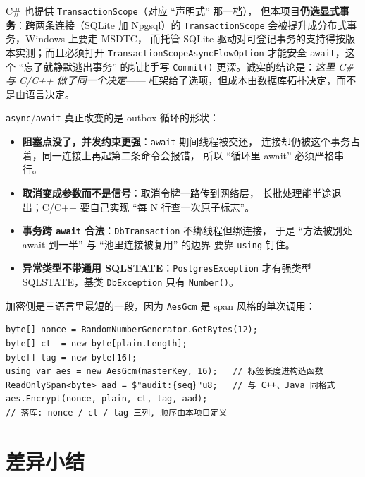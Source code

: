 \documentclass[12pt,a4paper,fontset=fandol]{ctexbook}
\newcommand{\Fn}[1]{\texttt{#1()}}
\newcommand{\Tp}[1]{\texttt{#1}}
\newcommand{\CSharp}{C\#}
\newcommand{\CppJava}{C/C++}
\begin{document}
\CSharp{} 也提供 \Tp{TransactionScope}（对应 ``声明式'' 那一档），
但本项目\textbf{仍选显式事务}：跨两条连接（SQLite 加 Npgsql）的
\Tp{TransactionScope} 会被提升成分布式事务，Windows 上要走 MSDTC，
而托管 SQLite 驱动对可登记事务的支持得按版本实测；而且必须打开
\Tp{Transaction\allowbreak Scope\allowbreak Async\allowbreak FlowOption}
才能安全 \Tp{await}，这个 ``忘了就静默逃出事务'' 的坑比手写 \Fn{Commit}
更深。诚实的结论是：\emph{这里 \CSharp{} 与 \CppJava{} 做了同一个决定}——
框架给了选项，但成本由数据库拓扑决定，而不是由语言决定。

\Tp{async}/\allowbreak{}\Tp{await} 真正改变的是 outbox 循环的形状：

\begin{itemize}
  \item \textbf{阻塞点没了，并发约束更强}：\Tp{await} 期间线程被交还，
        连接却仍被这个事务占着，同一连接上再起第二条命令会报错，
        所以 ``循环里 await'' 必须严格串行。
  \item \textbf{取消变成参数而不是信号}：取消令牌一路传到网络层，
        长批处理能半途退出；\CppJava{} 要自己实现 ``每 N 行查一次原子标志''。
  \item \textbf{事务跨 \Tp{await} 合法}：\Tp{DbTransaction} 不绑线程但绑连接，
        于是 ``方法被别处 await 到一半'' 与 ``池里连接被复用'' 的边界
        要靠 \Tp{using} 钉住。
  \item \textbf{异常类型不带通用 SQLSTATE}：\Tp{Postgres\allowbreak Exception}
        才有强类型 SQLSTATE，基类 \Tp{DbException} 只有 \Fn{Number}。
\end{itemize}

加密侧是三语言里最短的一段，因为 \Tp{AesGcm} 是 span 风格的单次调用：

\begin{lstlisting}[style=csharpstyle,caption={C\#：AesGcm 密封（标签天然分离）}]
byte[] nonce = RandomNumberGenerator.GetBytes(12);
byte[] ct  = new byte[plain.Length];
byte[] tag = new byte[16];
using var aes = new AesGcm(masterKey, 16);   // 标签长度进构造函数
ReadOnlySpan<byte> aad = $"audit:{seq}"u8;   // 与 C++、Java 同格式
aes.Encrypt(nonce, plain, ct, tag, aad);
// 落库: nonce / ct / tag 三列, 顺序由本项目定义
\end{lstlisting}

\section{差异小结}
\end{document}
